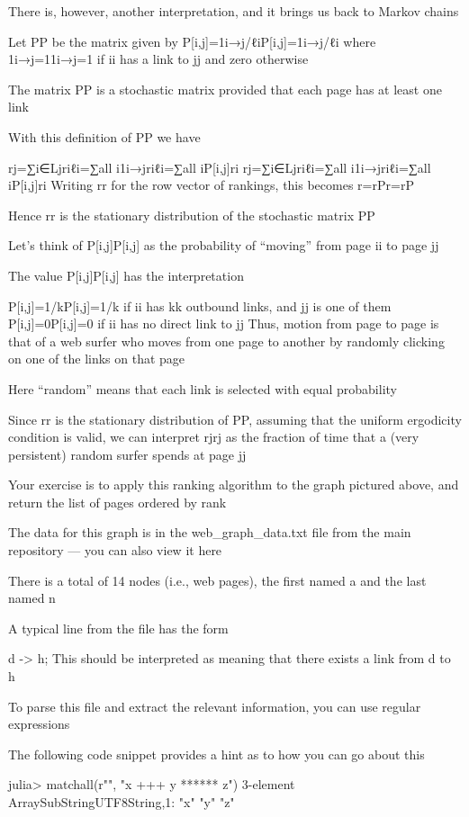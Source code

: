 There is, however, another interpretation, and it brings us back to Markov chains

Let PP be the matrix given by P[i,j]=1{i→j}/ℓiP[i,j]=1{i→j}/ℓi where 1{i→j}=11{i→j}=1 if ii has a link to jj and zero otherwise

The matrix PP is a stochastic matrix provided that each page has at least one link

With this definition of PP we have

rj=∑i∈Ljriℓi=∑all i1{i→j}riℓi=∑all iP[i,j]ri
rj=∑i∈Ljriℓi=∑all i1{i→j}riℓi=∑all iP[i,j]ri
Writing rr for the row vector of rankings, this becomes r=rPr=rP

Hence rr is the stationary distribution of the stochastic matrix PP

Let’s think of P[i,j]P[i,j] as the probability of “moving” from page ii to page jj

The value P[i,j]P[i,j] has the interpretation

P[i,j]=1/kP[i,j]=1/k if ii has kk outbound links, and jj is one of them
P[i,j]=0P[i,j]=0 if ii has no direct link to jj
Thus, motion from page to page is that of a web surfer who moves from one page to another by randomly clicking on one of the links on that page

Here “random” means that each link is selected with equal probability

Since rr is the stationary distribution of PP, assuming that the uniform ergodicity condition is valid, we can interpret rjrj as the fraction of time that a (very persistent) random surfer spends at page jj

Your exercise is to apply this ranking algorithm to the graph pictured above, and return the list of pages ordered by rank

The data for this graph is in the web_graph_data.txt file from the main repository — you can also view it here

There is a total of 14 nodes (i.e., web pages), the first named a and the last named n

A typical line from the file has the form

d -> h;
This should be interpreted as meaning that there exists a link from d to h

To parse this file and extract the relevant information, you can use regular expressions

The following code snippet provides a hint as to how you can go about this

julia> matchall(r"\w", "x +++ y ****** z")
3-element Array{SubString{UTF8String},1}:
 "x"
 "y"
 "z"

